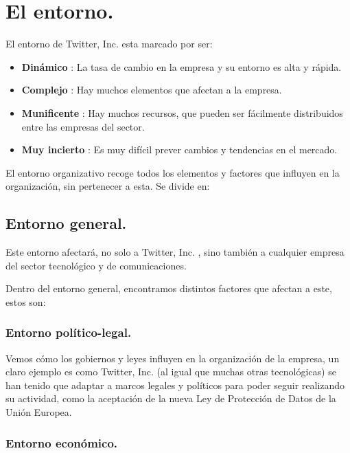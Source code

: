 
\section{El entorno.}

El entorno de Twitter, Inc. esta marcado por ser:

\begin{itemize}

\item \textbf{Dinámico} : La tasa de cambio en la empresa y su entorno es alta y rápida.

\item \textbf{Complejo} : Hay muchos elementos que afectan a la empresa.

\item \textbf{Munificente} : Hay muchos recursos, que pueden ser fácilmente distribuidos entre las empresas del sector.

\item \textbf{Muy incierto} : Es muy difícil prever cambios y tendencias en el mercado.

\end{itemize}

El entorno organizativo recoge todos los elementos y factores que influyen en la organización, sin pertenecer a esta. Se divide en:

\subsection{Entorno general.}

Este entorno afectará, no solo a Twitter, Inc. , sino también a cualquier empresa del sector tecnológico y de comunicaciones.

Dentro del entorno general, encontramos distintos factores que afectan a este, estos son:

\subsubsection{Entorno político-legal.}

Vemos cómo los gobiernos y leyes influyen en la organización de la empresa, un claro ejemplo es como Twitter, Inc. (al igual que muchas otras tecnológicas) se han tenido que adaptar a marcos legales y políticos para poder seguir realizando su actividad, como la aceptación de la nueva Ley de Protección de Datos de la Unión Europea.

\subsubsection{Entorno económico.}

